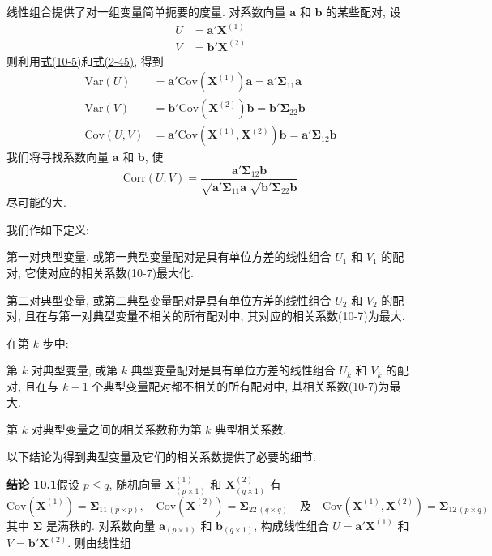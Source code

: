 线性组合提供了对一组变量简单扼要的度量. 对系数向量 $\mathbf{a}$ 和 $\mathbf{b}$ 的某些配对, 设
\label{eq:10-5}
\begin{equation}
\begin{aligned}
U&=\mathbf{a}'\mathbf{X}^{(1)}\\
V&=\mathbf{b}'\mathbf{X}^{(2)}
\end{aligned}
\tag{10-5}
\end{equation}
则利用\hyperref[eq:10-5]{式(10-5)}和\hyperref[eq:2-45]{式(2-45)}, 得到
\label{eq:10-6}
\begin{equation}
\begin{aligned}
\mathrm{Var}(U)&=\mathbf{a}'\mathrm{Cov}(\mathbf{X}^{(1)})\mathbf{a}=\mathbf{a}'\boldsymbol{\Sigma}_{11}\mathbf{a}\\
\mathrm{Var}(V)&=\mathbf{b}'\mathrm{Cov}(\mathbf{X}^{(2)})\mathbf{b}=\mathbf{b}'\boldsymbol{\Sigma}_{22}\mathbf{b}\\
\mathrm{Cov}(U,V)&=\mathbf{a}'\mathrm{Cov}(\mathbf{X}^{(1)},\mathbf{X}^{(2)})\mathbf{b}=\mathbf{a}'\boldsymbol{\Sigma}_{12}\mathbf{b}
\end{aligned}
\tag{10-6}
\end{equation}
我们将寻找系数向量 $\mathbf{a}$ 和 $\mathbf{b}$, 使
\label{eq:10-7}
\begin{equation}
\mathrm{Corr}(U,V)=\frac{\mathbf{a}'\boldsymbol{\Sigma}_{12}\mathbf{b}}{\sqrt{\mathbf{a}'\boldsymbol{\Sigma}_{11}\mathbf{a}}\ \sqrt{\mathbf{b}'\boldsymbol{\Sigma}_{22}\mathbf{b}}}
\tag{10-7}
\end{equation}
尽可能的大.

我们作如下定义:

第一对典型变量, 或第一典型变量配对是具有单位方差的线性组合 $U_1$ 和 $V_1$ 的配对, 它使对应的相关系数(10-7)最大化.

第二对典型变量, 或第二典型变量配对是具有单位方差的线性组合 $U_2$ 和 $V_2$ 的配对, 且在与第一对典型变量不相关的所有配对中, 其对应的相关系数(10-7)为最大.

在第 $k$ 步中:

第 $k$ 对典型变量, 或第 $k$ 典型变量配对是具有单位方差的线性组合 $U_k$ 和 $V_k$ 的配对, 且在与 $k-1$ 个典型变量配对都不相关的所有配对中, 其相关系数(10-7)为最大.

第 $k$ 对典型变量之间的相关系数称为第 $k$ 典型相关系数.

以下结论为得到典型变量及它们的相关系数提供了必要的细节.

\noindent\textbf{结论 10.1}\quad 假设 $p\le q$, 随机向量 $\mathbf{X}^{(1)}_{(p\times 1)}$ 和 $\mathbf{X}^{(2)}_{(q\times 1)}$ 有
\[
\mathrm{Cov}(\mathbf{X}^{(1)})=\boldsymbol{\Sigma}_{11\,(p\times p)},\quad \mathrm{Cov}(\mathbf{X}^{(2)})=\boldsymbol{\Sigma}_{22\,(q\times q)}\quad \text{及}\quad \mathrm{Cov}(\mathbf{X}^{(1)},\mathbf{X}^{(2)})=\boldsymbol{\Sigma}_{12\,(p\times q)}
\]
其中 $\boldsymbol{\Sigma}$ 是满秩的. 对系数向量 $\mathbf{a}_{(p\times 1)}$ 和 $\mathbf{b}_{(q\times 1)}$, 构成线性组合 $U=\mathbf{a}'\mathbf{X}^{(1)}$ 和 $V=\mathbf{b}'\mathbf{X}^{(2)}$. 则由线性组
